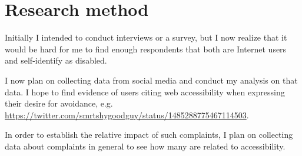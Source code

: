 \section{Research method}

Initially I intended to conduct interviews or a survey, but I now realize that it would
be hard for me to find enough respondents that both are Internet users and
self-identify as disabled.

I now plan on collecting data from social media and conduct my analysis on that data. I
hope to find evidence of users citing web accessibility when expressing their desire
for avoidance, e.g.
\url{https://twitter.com/smrtshygoodguy/status/1485288775467114503}.

In order to establish the relative impact of such complaints, I plan on collecting data
about complaints in general to see how many are related to accessibility.
